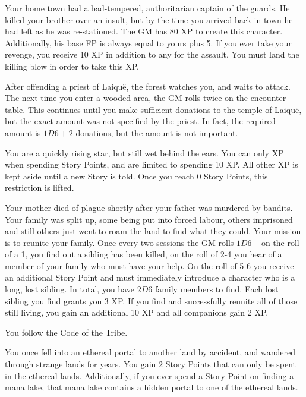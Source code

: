 \begin{multicols}{2}
\begin{list}{\addtocounter{list}{1}\textbf{:}}{\raggedleft}
  \item
  Your home town had a bad-tempered, authoritarian captain of the guards.
He killed your brother over an insult, but by the time you arrived back in town he had left as he was re-stationed.
The GM has 80 XP to create this character.
Additionally, his base FP is always equal to yours plus 5.
If you ever take your revenge, you receive 10 XP in addition to any for the assault.
You must land the killing blow in order to take this XP.
  \item{After offending a priest of Laiqu\"{e}, the forest watches you, and waits to attack.
  The next time you enter a wooded area, the GM rolls twice on the encounter table.
  This continues until you make sufficient donations to the temple of Laiqu\"e, but the exact amount was not specified by the priest.
  In fact, the required amount is $1D6 + 2$ donations, but the amount is not important.
  }

  \item
  You are a quickly rising star, but still wet behind the ears.
  You can only XP when spending Story Points, and are limited to spending 10 XP.
  All other XP is kept aside until a new Story is told.
  Once you reach 0 Story Points, this restriction is lifted.
  
  \item
  Your mother died of plague shortly after your father was murdered by bandits.
  Your family was split up, some being put into forced labour, others imprisoned and still others just went to roam the land to find what they could.
  Your mission is to reunite your family.
  Once every two sessions the GM rolls $1D6$ -- on the roll of a 1, you find out a sibling has been killed, on the roll of 2-4 you hear of a member of your family who must have your help.
  On the roll of 5-6 you receive an additional Story Point and must immediately introduce a character who is a long, lost sibling.
  In total, you have $2D6$ family members to find.
  Each lost sibling you find grants you 3 XP.
  If you find and successfully reunite all of those still living, you gain an additional 10 XP and all companions gain 2 XP.
  
  You follow the Code of the Tribe.

  \item
  You once fell into an ethereal portal to another land by accident, and wandered through strange lands for years.  You gain 2 Story Points that can only be spent in the ethereal lands.  Additionally, if you ever spend a Story Point on finding a mana lake, that mana lake contains a hidden portal to one of the ethereal lands.


\end{list}
\end{multicols}
